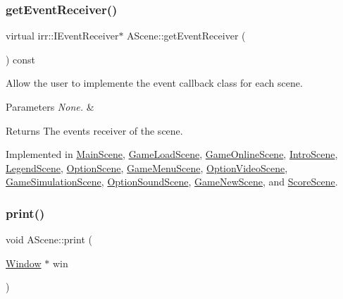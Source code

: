 \subsubsection{\texorpdfstring{get\+Event\+Receiver()}{getEventReceiver()}}
{\footnotesize\ttfamily virtual irr\+::\+I\+Event\+Receiver$\ast$ A\+Scene\+::get\+Event\+Receiver (\begin{DoxyParamCaption}{ }\end{DoxyParamCaption}) const\hspace{0.3cm}{\ttfamily [pure virtual]}}



Allow the user to implemente the event callback class for each scene. 


\begin{DoxyParams}{Parameters}
{\em None.} & \\
\hline
\end{DoxyParams}
\begin{DoxyReturn}{Returns}
The events\textquotesingle{} receiver of the scene. 
\end{DoxyReturn}


Implemented in \hyperlink{classMainScene_af9fbc6337aa6ff42447c702e91e77237}{Main\+Scene}, \hyperlink{classGameLoadScene_a81807790ad65bd2cf97a1e543cae2b74}{Game\+Load\+Scene}, \hyperlink{classGameOnlineScene_a00ce9773db4f1886fc463b023cbf63f9}{Game\+Online\+Scene}, \hyperlink{classIntroScene_acabf925dab7b2a346edd398445cd5800}{Intro\+Scene}, \hyperlink{classLegendScene_ab11340ae844c04d704f28e1ef188deae}{Legend\+Scene}, \hyperlink{classOptionScene_a8848b9040ee7fd9c1d05a22181c5e053}{Option\+Scene}, \hyperlink{classGameMenuScene_adcb01430b24486c4e5d0157fc32d7611}{Game\+Menu\+Scene}, \hyperlink{classOptionVideoScene_a84625e871c5176d7abc77a7f12c1472a}{Option\+Video\+Scene}, \hyperlink{classGameSimulationScene_a048b2a937caff3af7b4d54f8bd404ec1}{Game\+Simulation\+Scene}, \hyperlink{classOptionSoundScene_ac71da65763f0db4b05fc32444308b677}{Option\+Sound\+Scene}, \hyperlink{classGameNewScene_a21c27ef3ea1923d975683e1bcdd134fa}{Game\+New\+Scene}, and \hyperlink{classScoreScene_ae398ba58a33b3605a0c71265202534e2}{Score\+Scene}.

\mbox{\label{classAScene_ae5d7463a823ed64f3846b5847340b68c}} 
\subsubsection{\texorpdfstring{print()}{print()}}
{\footnotesize\ttfamily void A\+Scene\+::print (\begin{DoxyParamCaption}\item[{\hyperlink{classWindow}{Window} $\ast$}]{win }\end{DoxyParamCaption})}



